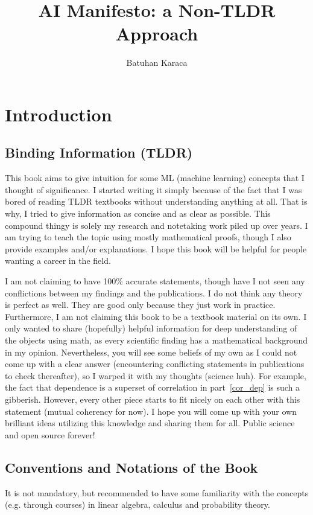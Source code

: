 \documentclass{article}
\title{AI Manifesto: a Non-TLDR Approach}
\author{Batuhan Karaca}
\numberwithin{equation}{subsection}
\begin{document}
\maketitle
\tableofcontents
\section{Introduction}
\subsection{Binding Information (TLDR)}
This book aims to give intuition for some ML (machine learning) concepts that I thought of significance. I started writing it simply because of the fact that I was bored of reading TLDR textbooks without understanding anything at all. That is why, I tried to give information as concise and as clear as possible. This compound thingy is solely my research and notetaking work piled up over years. I am trying to teach the topic using mostly mathematical proofs, though I also provide examples and/or explanations. I hope this book will be helpful for people wanting a career in the field.

I am not claiming to have 100\% accurate statements, though have I not seen any conflictions between my findings and the publications. I do not think any theory is perfect as well. They are good only because they just work in practice. Furthermore, I am not claiming this book to be a textbook material on its own. I only wanted to share (hopefully) helpful information for deep understanding of the objects using math, as every scientific finding has a mathematical background in my opinion. Nevertheless, you will see some beliefs of my own as I could not come up with a clear answer (encountering conflicting statements in publications to check thereafter), so I warped it with my thoughts (science huh). For example, the fact that dependence is a superset of correlation in part~\ref{cor_dep} is such a gibberish. However, every other piece starts to fit nicely on each other with this statement (mutual coherency for now). I hope you will come up with your own brilliant ideas utilizing this knowledge and sharing them for all. Public science and open source forever!
\subsection{Conventions and Notations of the Book}
It is not mandatory, but recommended to have some familiarity with the concepts (e.g. through courses) in linear algebra, calculus and probability theory. 
\end{document}
